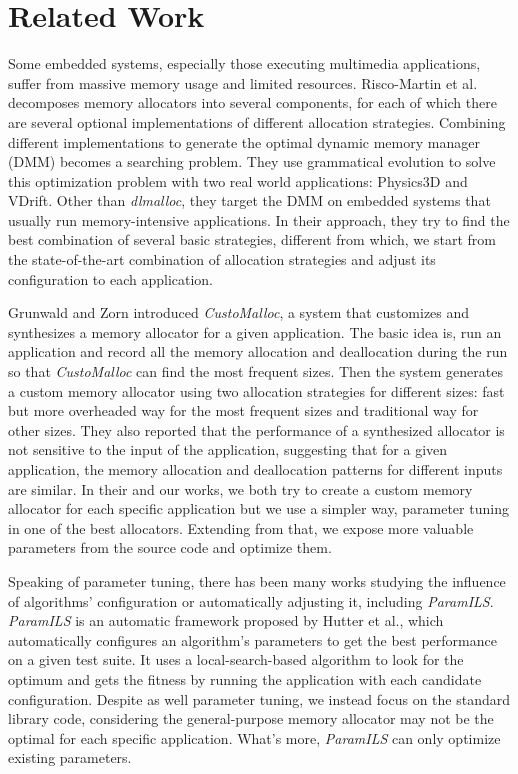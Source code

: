 \section{Related Work}

Some embedded systems, especially those executing multimedia applications, suffer from massive memory usage and limited resources. Risco-Martin et al.\cite{Risco-Martin:2009:ODM:1569901.1570116}\cite{RiscoMartin2010572} decomposes memory allocators into several components, for each of which there are several optional implementations of different allocation strategies. Combining different implementations to generate the optimal dynamic memory manager (DMM) becomes a searching problem. They use grammatical evolution to solve this optimization problem with two real world applications: Physics3D and VDrift. Other than \emph{dlmalloc}, they target the DMM on embedded systems that usually run memory-intensive applications. In their approach, they try to find the best combination of several basic strategies, different from which, we start from the state-of-the-art combination of allocation strategies and adjust its configuration to each application. 

Grunwald and Zorn introduced \emph{CustoMalloc}, a system that customizes and synthesizes a memory allocator for a given application\cite{SPE:SPE4380230804}. The basic idea is, run an application and record all the memory allocation and deallocation during the run so that \emph{CustoMalloc} can find the most frequent sizes. Then the system generates a custom memory allocator using two allocation strategies for different sizes: fast but more overheaded way for the most frequent sizes and traditional way for other sizes. They also reported that the performance of a synthesized allocator is not sensitive to the input of the application, suggesting that for a given application, the memory allocation and deallocation patterns for different inputs are similar. In their and our works, we both try to create a custom memory allocator for each specific application but we use a simpler way, parameter tuning in one of the best allocators. Extending from that, we expose more valuable parameters from the source code and optimize them.

Speaking of parameter tuning, there has been many works studying the influence of algorithms' configuration or automatically adjusting it, including \emph{ParamILS}\cite{hutter2009paramils}. \emph{ParamILS} is an automatic framework proposed by Hutter et al., which automatically configures an algorithm's parameters to get the best performance on a given test suite. It uses a local-search-based algorithm to look for the optimum and gets the fitness by running the application with each candidate configuration. Despite as well parameter tuning, we instead focus on the standard library code, considering the general-purpose memory allocator may not be the optimal for each specific application. What's more, \emph{ParamILS} can only optimize existing parameters. 

